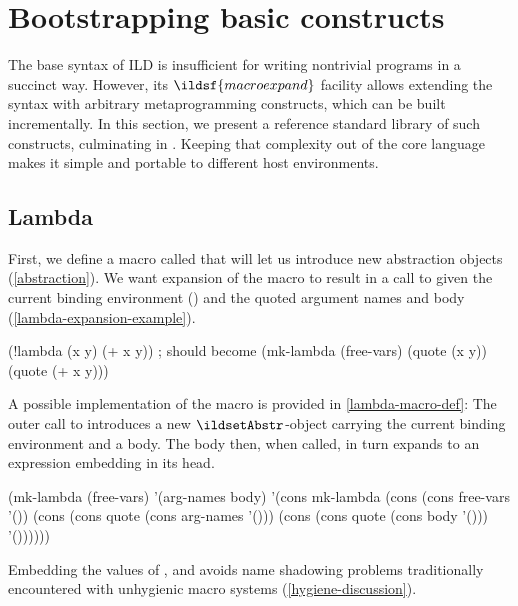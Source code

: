 \section{Bootstrapping basic constructs}
\label{bootstrapping-basic}
The base syntax of ILD is insufficient for writing nontrivial programs
in a succinct way. However, its \(\ildsf{macroexpand}\) facility allows
extending the syntax with arbitrary metaprogramming constructs, which can
be built incrementally.
In this section, we present a reference standard library
of such constructs, culminating in .
Keeping that complexity out of the core language makes it simple and portable
to different host environments.

\subsection{Lambda}
\label{lambda-macro}
First, we define a macro called  that will let us introduce new
abstraction objects (\cref{abstraction}). We want expansion of the 
macro to result in a call to  given the current binding environment
() and the quoted argument names and body (\cref{lambda-expansion-example}).
\pagebreak %
\begin{listingbox}\begin{ildcode}
(!lambda (x y) (+ x y))
; should become
(mk-lambda (free-vars) (quote (x y))
  (quote (+ x y)))
\end{ildcode}\end{listingbox}
\label{lambda-expansion-example}
A possible implementation of the  macro is provided in \cref{lambda-macro-def}:
The outer call to  introduces a new \(\ildsetAbstr\)-object
carrying the current binding environment
and a body. The body then, when called, in turn
expands to an expression embedding  in its head.
\begin{listingbox}\begin{ildcode}
(mk-lambda
  (free-vars)
  '(arg-names body)
  '(cons mk-lambda
    (cons (cons free-vars '())
      (cons (cons quote (cons arg-names '()))
        (cons (cons quote (cons body '()))
          '())))))
\end{ildcode}\end{listingbox}
\label{lambda-macro-def}
Embedding the values of ,  and 
avoids name shadowing problems traditionally encountered with unhygienic
macro systems (\cref{hygiene-discussion}).

